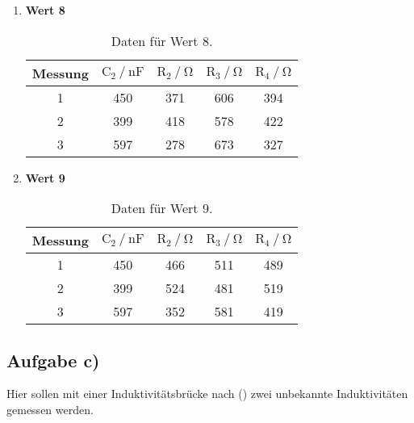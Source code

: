 \begin{enumerate}
\item \textbf{Wert 8}

\begin{table}
\centering
\begin{tabular}{c c c c c}
\toprule
{Messung} & {$\text{C}_2 \mathbin{/} \si{\nano\farad}$} &{$ \text{R}_2 \mathbin{/} \si{\ohm} $} & {$ \text{R}_3 \mathbin{/} \si{\ohm} $} & {$ \text{R}_4 \mathbin{/} \si{\ohm} $} \\
\midrule
1 & 450 & 371 & 606 & 394 \\
2 & 399 & 418 & 578 & 422 \\
3 & 597 & 278 & 673 & 327 \\
\bottomrule
\end{tabular}
\caption{Daten für Wert 8.}
\label{tab:ab8}
\end{table}

\newpage

\item \textbf{Wert 9}

\begin{table}
\centering
\begin{tabular}{c c c c c}
\toprule
{Messung} & {$\text{C}_2 \mathbin{/} \si{\nano\farad}$} &{$ \text{R}_2 \mathbin{/} \si{\ohm} $} & {$ \text{R}_3 \mathbin{/} \si{\ohm} $} & {$ \text{R}_4 \mathbin{/} \si{\ohm} $} \\
\midrule
1 & 450 & 466 & 511 & 489 \\
2 & 399 & 524 & 481 & 519 \\
3 & 597 & 352 & 581 & 419 \\
\bottomrule
\end{tabular}
\caption{Daten für Wert 9.}
\label{tab:ab9}
\end{table}

\end{enumerate}

\subsection{Aufgabe c)}

Hier sollen mit einer Induktivitätsbrücke nach () zwei unbekannte Induktivitäten gemessen werden.

